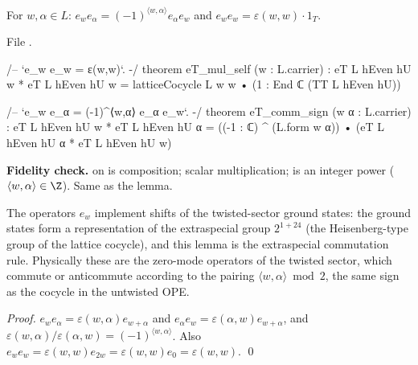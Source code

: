 \begin{lemma}\label{ch11:lem:ew}
For $w,\alpha\in L$: $e_we_\alpha=(-1)^{\langle w,\alpha\rangle}e_\alpha e_w$ and
$e_we_w=\varepsilon(w,w)\cdot 1_T$.
\end{lemma}
\noindent File .
\begin{leancode}
/-- `e_w e_w = ε(w,w)`. -/
theorem eT_mul_self (w : L.carrier) :
    eT L hEven hU w * eT L hEven hU w = latticeCocycle L w w • (1 : End ℂ (TT L hEven hU))

/-- `e_w e_α = (-1)^{⟨w,α⟩} e_α e_w`. -/
theorem eT_comm_sign (w α : L.carrier) :
    eT L hEven hU w * eT L hEven hU α
      = ((-1 : ℂ) ^ (L.form w α)) • (eT L hEven hU α * eT L hEven hU w)
\end{leancode}
\begin{dictionary}
\textbf{Fidelity check.}  \lean{*} on  is composition;  scalar
multiplication;  is an integer power ($\langle w,\alpha\rangle\in\Z$).
Same as the lemma.
\end{dictionary}

\begin{physics}
The operators $e_w$ implement shifts of the twisted-sector ground states: the ground states form a representation of the extraspecial group $2^{1+24}$ (the Heisenberg-type group of the lattice cocycle), and this lemma is the extraspecial commutation rule. Physically these are the zero-mode operators of the twisted sector, which commute or anticommute according to the pairing $\langle w,\alpha\rangle \bmod 2$, the same sign as the cocycle in the untwisted OPE.
\end{physics}
\emph{Proof.}  $e_we_\alpha=\varepsilon(w,\alpha)e_{w+\alpha}$ and
$e_\alpha e_w=\varepsilon(\alpha,w)e_{w+\alpha}$, and $\varepsilon(w,\alpha)/\varepsilon(\alpha,w)=
(-1)^{\langle w,\alpha\rangle}$.  Also $e_we_w=\varepsilon(w,w)e_{2w}=\varepsilon(w,w)e_0=\varepsilon(w,w)$.
\qed

